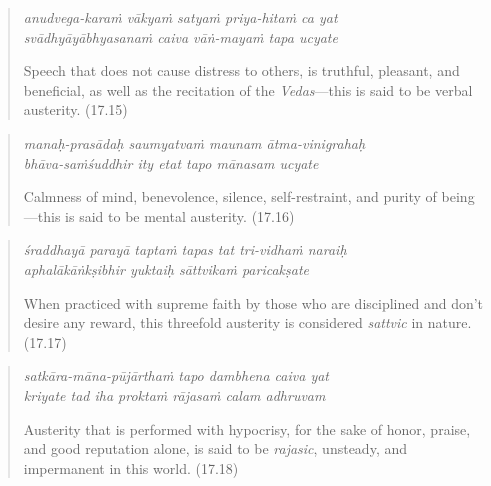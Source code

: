 \documentclass[12pt, twoside, openright]{memoir}
\begin{document}
\par
\begin{verse}
\textit{anudvega-karaṁ vākyaṁ satyaṁ priya-hitaṁ ca yat} \\
\textit{svādhyāyābhyasanaṁ caiva vāṅ-mayaṁ tapa ucyate}

\noindent Speech that does not cause distress to others, is truthful, pleasant, and beneficial, as well as the recitation of the \textit{Vedas}---this is said to be verbal austerity. (17.15)
\end{verse}
\par



\par
\begin{verse}
\textit{manaḥ-prasādaḥ saumyatvaṁ maunam ātma-vinigrahaḥ} \\
\textit{bhāva-saṁśuddhir ity etat tapo mānasam ucyate}

\noindent Calmness of mind, benevolence, silence, self-restraint, and purity of being---this is said to be mental austerity. (17.16)
\end{verse}
\par



\par
\begin{verse}
\textit{śraddhayā parayā taptaṁ tapas tat tri-vidhaṁ naraiḥ} \\
\textit{aphalākāṅkṣibhir yuktaiḥ sāttvikaṁ paricakṣate}

\noindent When practiced with supreme faith by those who are disciplined and don't desire any reward, this threefold austerity is considered \textit{sattvic} in nature. (17.17)
\end{verse}
\par



\par
\begin{verse}
\textit{satkāra-māna-pūjārthaṁ tapo dambhena caiva yat} \\
\textit{kriyate tad iha proktaṁ rājasaṁ calam adhruvam}

\noindent Austerity that is performed with hypocrisy, for the sake of honor, praise, and good reputation alone, is said to be \textit{rajasic}, unsteady, and impermanent in this world. (17.18)
\end{verse}
\par
\end{document}
